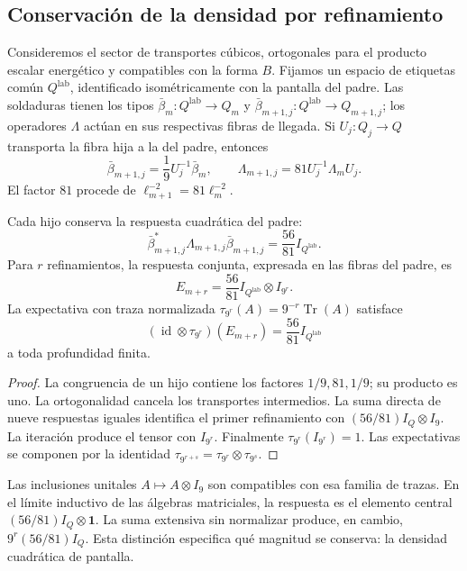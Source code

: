 \subsection{Conservación de la densidad por refinamiento}
\label{vii:sec:densidad-refinamiento}

Consideremos el sector de transportes cúbicos, ortogonales para el producto
escalar energético y compatibles con la forma \(B\). Fijamos un
espacio de etiquetas común \(Q^{\mathrm{lab}}\), identificado
isométricamente con la pantalla del padre. Las soldaduras tienen
los tipos
\(\bar\beta_m:Q^{\mathrm{lab}}\longrightarrow Q_m\) y
\(\bar\beta_{m+1,j}:Q^{\mathrm{lab}}\longrightarrow Q_{m+1,j}\);
los operadores \(\Lambda\) actúan en sus respectivas fibras de llegada.
Si
\(U_j:Q_j\longrightarrow Q\) transporta la fibra hija a la del padre,
entonces
\[
 \bar\beta_{m+1,j}=\frac19U_j^{-1}\bar\beta_m,\qquad
 \Lambda_{m+1,j}=81U_j^{-1}\Lambda_mU_j.
\]
El factor \(81\) procede de \(\ell_{m+1}^{-2}=81\ell_m^{-2}\).

\begin{theorem}
\label{vii:thm:densidad}
Cada hijo conserva la respuesta cuadrática del padre:
\[
 \bar\beta_{m+1,j}^*\Lambda_{m+1,j}\bar\beta_{m+1,j}
 =\frac{56}{81}I_{Q^{\mathrm{lab}}}.
\]
Para \(r\) refinamientos, la respuesta conjunta, expresada en las fibras
del padre, es
\[
 E_{m+r}=\frac{56}{81}I_{Q^{\mathrm{lab}}}\otimes I_{9^r}.
\]
La expectativa con traza normalizada
\(\tau_{9^r}(A)=9^{-r}\operatorname{Tr}(A)\) satisface
\[
 (\operatorname{id}\otimes\tau_{9^r})(E_{m+r})
 =\frac{56}{81}I_{Q^{\mathrm{lab}}}
\]
a toda profundidad finita.
\end{theorem}

\begin{proof}
La congruencia de un hijo contiene los factores \(1/9,81,1/9\);
su producto es uno. La ortogonalidad cancela los transportes
intermedios. La suma directa de nueve respuestas iguales identifica
el primer refinamiento con \((56/81)I_Q\otimes I_9\).
La iteración produce el tensor con \(I_{9^r}\).
Finalmente \(\tau_{9^r}(I_{9^r})=1\). Las expectativas se componen
por la identidad
\(\tau_{9^{r+s}}=\tau_{9^r}\otimes\tau_{9^s}\).
\end{proof}

Las inclusiones unitales \(A\mapsto A\otimes I_9\) son compatibles con
esa familia de trazas. En el límite inductivo de las álgebras matriciales,
la respuesta es el elemento central
\((56/81)I_Q\otimes\mathbf1\). La suma extensiva sin normalizar produce,
en cambio, \(9^r(56/81)I_Q\). Esta distinción especifica qué magnitud
se conserva: la densidad cuadrática de pantalla.

